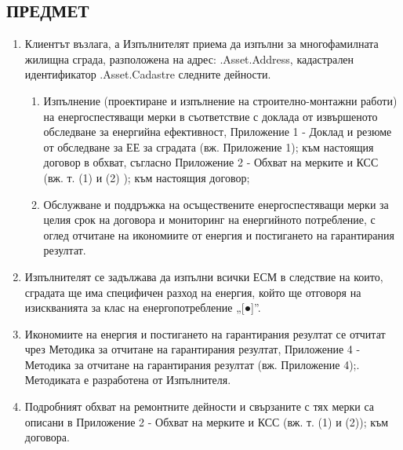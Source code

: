 \subsection{ПРЕДМЕТ}
\begin{enumerate}
\item Клиентът възлага, а Изпълнителят приема да изпълни за
  многофамилната жилищна сграда, разположена на адрес: {{.Asset.Address}},
  кадастрален идентификатор {{.Asset.Cadastre}} следните дейности.
  \begin{enumerate}[label=\arabic*.]
  \item Изпълнение (проектиране и изпълнение на строително-монтажни
    работи) на енергоспестяващи мерки в съответствие с доклада от
    извършеното обследване за енергийна ефективност, Приложение 1 {-}
    Доклад и резюме от обследване за ЕЕ за сградата (вж. Приложение 1);
    към настоящия договор в обхват, съгласно Приложение 2 {-} Обхват на
    мерките и КСС (вж. т. (1) и (2) ); към настоящия договор;
  \item Обслужване и поддръжка на осъществените енергоспестяващи мерки
    за целия срок на договора и мониторинг на енергийното потребление,
    с оглед отчитане на икономиите от енергия и постигането на
    гарантирания резултат.
  \end{enumerate}
\item Изпълнителят се задължава да изпълни всички ЕСМ в следствие на
  които, сградата ще има специфичен разход на енергия, който ще
  отговоря на изискванията за клас на енергопотребление „[●]”.
\item Икономиите на енергия и постигането на гарантирания резултат се
  отчитат чрез Методика за отчитане на гарантирания резултат,
  Приложение 4 {-} Методика за отчитане на гарантирания резултат
  (вж. Приложение 4);. Методиката е разработена от Изпълнителя.
\item Подробният обхват на ремонтните дейности и свързаните с тях
  мерки са описани в Приложение 2 {-} Обхват на мерките и КСС (вж. т. (1) и (2)); към договора.
\end{enumerate}

